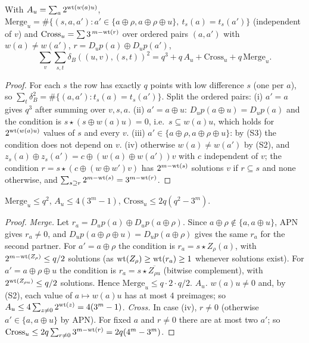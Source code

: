 \begin{lemma}\label{lem:Eid}
With $A_u=\sum_a 2^{\mathrm{wt}(w(a)u)}$,
$\mathrm{Merge}_u=\#\{(s,a,a'): a'\in\{a\oplus\rho,a\oplus\rho\oplus u\},\ t_s(a)=t_s(a')\}$ (independent of $v$) and
$\mathrm{Cross}_u=\sum 3^{\,m-\mathrm{wt}(r)}$ over ordered pairs $(a,a')$ with $w(a)\ne w(a')$, $r=D_up(a)\oplus D_up(a')$,
\[
\sum_v\sum_{s,t}\delta_B((u,v),(s,t))^2=q^3+q\,A_u+\mathrm{Cross}_u+q\,\mathrm{Merge}_u .
\]
\end{lemma}
\begin{proof}
For each $s$ the row has exactly $q$ points with low difference $s$ (one per $a$), so
$\sum_t\delta_B^2=\#\{(a,a'):t_s(a)=t_s(a')\}$. Split the ordered pairs:
(i) $a'=a$ gives $q^3$ after summing over $v,s,a$.
(ii) $a'=a\oplus u$: $D_up(a\oplus u)=D_up(a)$ and the condition is $s\star(s\oplus w(a)u)=0$, i.e.\ $s\subseteq w(a)u$,
which holds for $2^{\mathrm{wt}(w(a)u)}$ values of $s$ and every $v$.
(iii) $a'\in\{a\oplus\rho,a\oplus\rho\oplus u\}$: by (S3) the condition does not depend on $v$.
(iv) otherwise $w(a)\ne w(a')$ by (S2), and $z_s(a)\oplus z_s(a')=c\oplus(w(a)\oplus w(a'))v$ with $c$ independent
of $v$; the condition $r=s\star(c\oplus(w\oplus w')v)$ has $2^{m-\mathrm{wt}(s)}$ solutions $v$ if $r\subseteq s$ and none
otherwise, and $\sum_{s\supseteq r}2^{m-\mathrm{wt}(s)}=3^{m-\mathrm{wt}(r)}$.
\end{proof}

\begin{lemma}\label{lem:UEbounds}
$\mathrm{Merge}_u\le q^2$, $A_u\le4(3^m-1)$, $\mathrm{Cross}_u\le 2q(q^2-3^m)$.
\end{lemma}
\begin{proof}
\emph{Merge.} Let $r_a=D_up(a)\oplus D_up(a\oplus\rho)$. Since $a\oplus\rho\notin\{a,a\oplus u\}$, APN gives
$r_a\ne0$, and $D_up(a\oplus\rho\oplus u)=D_up(a\oplus\rho)$ gives the same $r_a$ for the second partner. For
$a'=a\oplus\rho$ the condition is $r_a=s\star Z_\rho(a)$, with $2^{m-\mathrm{wt}(Z_\rho)}\le q/2$ solutions (as $\mathrm{wt}(Z_\rho)\ge\mathrm{wt}(r_a)\ge1$
whenever solutions exist). For $a'=a\oplus\rho\oplus u$ the condition is $r_a=s\star\overline{Z_{\rho u}}$ (bitwise
complement), with $2^{\mathrm{wt}(Z_{\rho u})}\le q/2$ solutions. Hence $\mathrm{Merge}_u\le q\cdot2\cdot q/2$.
\emph{$A_u$.} $w(a)u\ne0$ and, by (S2), each value of $a\mapsto w(a)u$ has at most $4$ preimages; so
$A_u\le4\sum_{z\ne0}2^{\mathrm{wt}(z)}=4(3^m-1)$.
\emph{Cross.} In case (iv), $r\ne0$ (otherwise $a'\in\{a,a\oplus u\}$ by APN). For fixed $a$ and $r\ne0$ there are
at most two $a'$; so $\mathrm{Cross}_u\le2q\sum_{r\ne0}3^{m-\mathrm{wt}(r)}=2q(4^m-3^m)$.
\end{proof}

